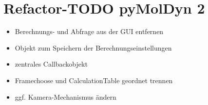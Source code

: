 \thispagestyle{empty}
\section*{Refactor-TODO pyMolDyn 2}
\begin{itemize}
	\item Berechnungs- und Abfrage aus der GUI entfernen
	\item Objekt zum Speichern der Berechnungseinstellungen
	\item zentrales Callbackobjekt
	\item Framechoose und CalculationTable geordnet trennen
	\item ggf. Kamera-Mechanismus ändern
\end{itemize}